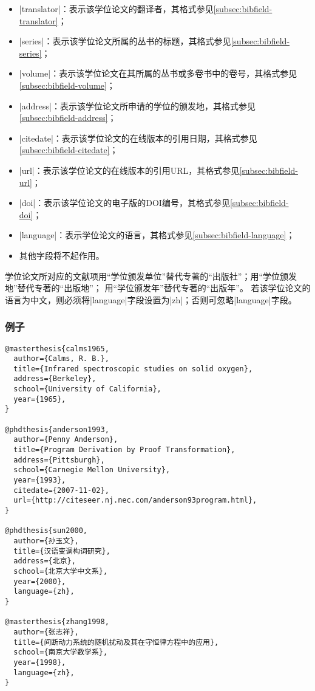 \begin{itemize}
\item |translator|：表示该学位论文的翻译者，其格式参见\ref{subsec:bibfield-translator}；
\item |series|：表示该学位论文所属的丛书的标题，其格式参见\ref{subsec:bibfield-series}；
\item |volume|：表示该学位论文在其所属的丛书或多卷书中的卷号，其格式参见\ref{subsec:bibfield-volume}；

\item |address|：表示该学位论文所申请的学位的颁发地，其格式参见\ref{subsec:bibfield-address}；
\item |citedate|：表示该学位论文的在线版本的引用日期，其格式参见\ref{subsec:bibfield-citedate}；
\item |url|：表示该学位论文的在线版本的引用URL，其格式参见\ref{subsec:bibfield-url}；
\item |doi|：表示该学位论文的电子版的DOI编号，其格式参见\ref{subsec:bibfield-doi}；
\item |language|：表示学位论文的语言，其格式参见\ref{subsec:bibfield-language}；
\item 其他字段将不起作用。
\end{itemize}

\begin{note}
学位论文所对应的文献项用“学位颁发单位”替代专著的“出版社”；用“学位颁发地”替代专著的“出版地”；
用“学位颁发年”替代专著的“出版年”。
若该学位论文的语言为中文，则必须将|language|字段设置为|zh|；否则可忽略|language|字段。
\end{note}

\subsubsection{例子}

\begin{verbatim}
@masterthesis{calms1965,
  author={Calms, R. B.},
  title={Infrared spectroscopic studies on solid oxygen},
  address={Berkeley},
  school={University of California},
  year={1965},
}

@phdthesis{anderson1993,
  author={Penny Anderson},
  title={Program Derivation by Proof Transformation},
  address={Pittsburgh},
  school={Carnegie Mellon University},
  year={1993},
  citedate={2007-11-02},
  url={http://citeseer.nj.nec.com/anderson93program.html},
}

@phdthesis{sun2000,
  author={孙玉文},
  title={汉语变调构词研究},
  address={北京},
  school={北京大学中文系},
  year={2000},
  language={zh},
}

@masterthesis{zhang1998,
  author={张志祥},
  title={间断动力系统的随机扰动及其在守恒律方程中的应用},
  school={南京大学数学系},
  year={1998},
  language={zh},
}
\end{verbatim}
